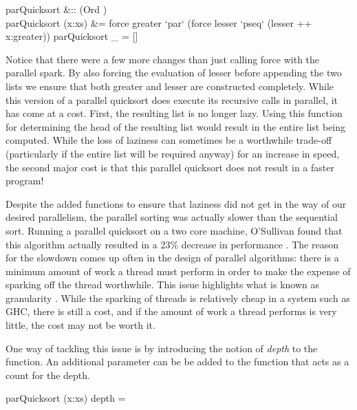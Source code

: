 \begin{haskell}
parQuicksort &:: (Ord \hasalpha) \Rightarrow [\hasalpha] \to [\hasalpha]\\
parQuicksort (x:xs) &= force greater `par` (force lesser `pseq` (lesser ++ x:greater))
parQuicksort \_ = []
\end{haskell}

Notice that there were a few more changes than just calling \<force\> with
the parallel spark. By also forcing the evaluation of \<lesser\> before
appending the two lists we ensure that both \<greater\> and \<lesser\>
are constructed completely. While this version of a parallel \<quicksort\> does
execute its recursive calls in parallel, it has come at a cost. First, the
resulting list is no longer lazy. Using this function for determining the head
of the resulting list would result in the entire list being computed. While
the loss of laziness can sometimes be a worthwhile trade-off (particularly
if the entire list will be required anyway) for an increase in speed, the
second major cost is that this parallel \<quicksort\> does not result in a faster
program!

    Despite the added functions to ensure that laziness did not get in the way
of our desired parallelism, the parallel sorting was actually slower than the
sequential sort. Running a parallel \<quicksort\> on a two core machine, O'Sullivan
found that this algorithm actually resulted in a $23\%$ decrease in
performance \citep{realWorld}. The reason for the slowdown comes up often in the
design of parallel algorithms: there is a minimum amount of work a thread must
perform in order to make the expense of sparking off the thread worthwhile. This
issue highlights what is known as granularity \citep{dutchBook}. While the sparking
of threads is relatively cheap in a system such as GHC, there is still a cost,
and if the amount of work a thread performs is very little, the cost may not be
worth it.

    One way of tackling this issue is by introducing the notion of \emph{depth}
to the function. An additional parameter can be be added to the function that
acts as a count for the depth.

\begin{haskell}
parQuicksort (x:xs) depth = 
\end{haskell}

